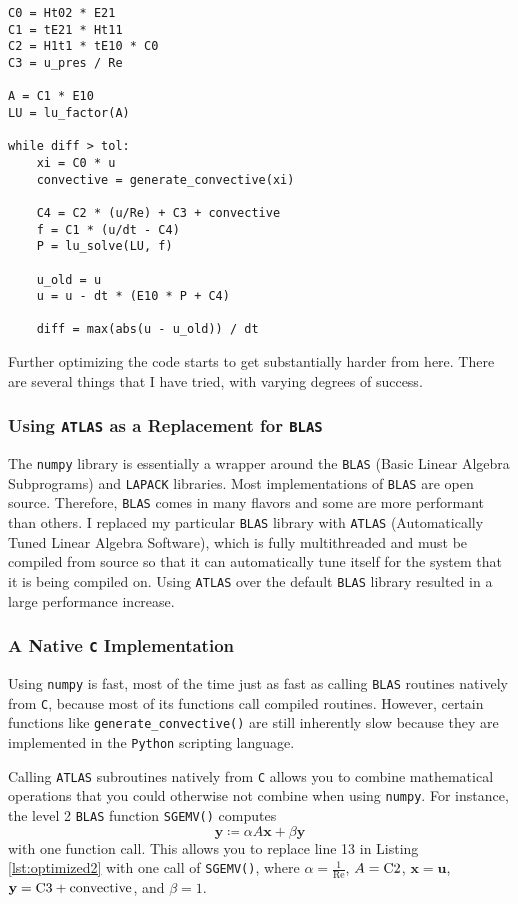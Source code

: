\begin{lstlisting}[caption=Code excerpt after moving the factorization stage., label=lst:optimized2]
C0 = Ht02 * E21
C1 = tE21 * Ht11
C2 = H1t1 * tE10 * C0
C3 = u_pres / Re

A = C1 * E10
LU = lu_factor(A)

while diff > tol:
    xi = C0 * u
    convective = generate_convective(xi)
    
    C4 = C2 * (u/Re) + C3 + convective
    f = C1 * (u/dt - C4)
    P = lu_solve(LU, f)
    
    u_old = u
    u = u - dt * (E10 * P + C4)
    
    diff = max(abs(u - u_old)) / dt
\end{lstlisting}

Further optimizing the code starts to get substantially harder from here. There are several things that I have tried, with varying degrees of success.

\subsubsection{Using \texttt{ATLAS} as a Replacement for \texttt{BLAS}}

The \texttt{numpy} library is essentially a wrapper around the \texttt{BLAS} (Basic Linear Algebra Subprograms) and \texttt{LAPACK} libraries. Most implementations of \texttt{BLAS} are open source. Therefore, \texttt{BLAS} comes in many flavors and some are more performant than others. I replaced my particular \texttt{BLAS} library with \texttt{ATLAS} (Automatically Tuned Linear Algebra Software), which is fully multithreaded and must be compiled from source so that it can automatically tune itself for the system that it is being compiled on. Using \texttt{ATLAS} over the default \texttt{BLAS} library resulted in a large performance increase.

\subsubsection{A Native \texttt{C} Implementation}

Using \texttt{numpy} is fast, most of the time just as fast as calling \texttt{BLAS} routines natively from \texttt{C}, because most of its functions call compiled routines. However, certain functions like \lstinline|generate_convective()| are still inherently slow because they are implemented in the \texttt{Python} scripting language. 
 
Calling \texttt{ATLAS} subroutines natively from \texttt{C} allows you to combine mathematical operations that you could otherwise not combine when using \texttt{numpy}. For instance, the level 2 \texttt{BLAS} function \texttt{SGEMV()} computes
\begin{equation}
    \mathbf{y} \coloneqq \alpha A \mathbf{x} + \beta \mathbf{y}
\end{equation}
with one function call. This allows you to replace line 13 in Listing \ref{lst:optimized2} with one call of \texttt{SGEMV()}, where $\alpha = \frac{1}{\text{Re}}$, $A = \text{\lstinline|C2|}$, $\mathbf{x} = \mathbf{u}$, $\mathbf{y} = \text{\lstinline|C3|} + \text{convective}$, and $\beta = 1$.
        
